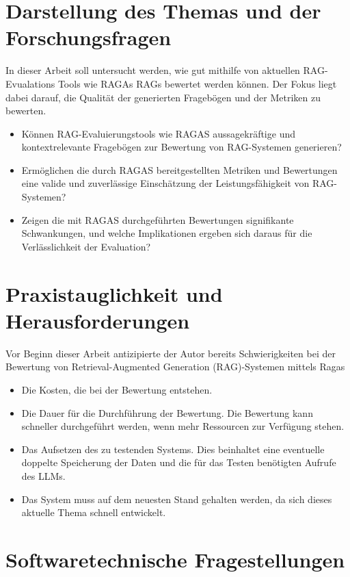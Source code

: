 \section{Darstellung des Themas und der Forschungsfragen}
In dieser Arbeit soll untersucht werden, wie gut mithilfe von aktuellen RAG-Evualations Tools wie RAGAs RAGs bewertet werden können.
Der Fokus liegt dabei darauf, die Qualität der generierten Fragebögen und der Metriken zu bewerten.

\begin{itemize}
    \item Können RAG-Evaluierungstools wie RAGAS aussagekräftige und kontextrelevante Fragebögen zur Bewertung von RAG-Systemen generieren?
    \item Ermöglichen die durch RAGAS bereitgestellten Metriken und Bewertungen eine valide und zuverlässige Einschätzung der Leistungsfähigkeit von RAG-Systemen?
    \item Zeigen die mit RAGAS durchgeführten Bewertungen signifikante Schwankungen, und welche Implikationen ergeben sich daraus für die Verlässlichkeit der Evaluation?
\end{itemize}


\section{Praxistauglichkeit und Herausforderungen}
Vor Beginn dieser Arbeit antizipierte der Autor bereits Schwierigkeiten bei der Bewertung von Retrieval-Augmented Generation (RAG)-Systemen mittels Ragas
\begin{itemize}
    \item Die Kosten, die bei der Bewertung entstehen.
    \item Die Dauer für die Durchführung der Bewertung. Die Bewertung kann schneller durchgeführt werden, wenn mehr Ressourcen zur Verfügung stehen.
    \item Das Aufsetzen des zu testenden Systems. Dies beinhaltet eine eventuelle doppelte Speicherung der Daten und die für das Testen benötigten Aufrufe des LLMs.
    \item Das System muss auf dem neuesten Stand gehalten werden, da sich dieses aktuelle Thema schnell entwickelt.
\end{itemize}

\section{Softwaretechnische Fragestellungen}

